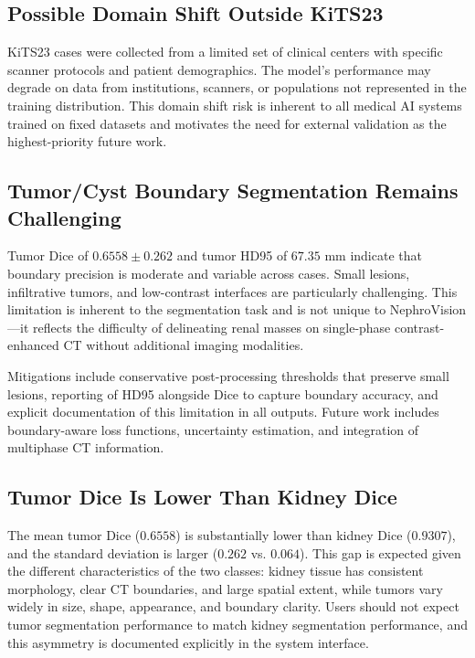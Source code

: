 \subsection{Possible Domain Shift Outside KiTS23}

KiTS23 cases were collected from a limited set of clinical centers with specific scanner protocols and patient demographics. The model's performance may degrade on data from institutions, scanners, or populations not represented in the training distribution. This domain shift risk is inherent to all medical AI systems trained on fixed datasets and motivates the need for external validation as the highest-priority future work.

\subsection{Tumor/Cyst Boundary Segmentation Remains Challenging}

Tumor Dice of $0.6558 \pm 0.262$ and tumor HD95 of $67.35$ mm indicate that boundary precision is moderate and variable across cases. Small lesions, infiltrative tumors, and low-contrast interfaces are particularly challenging. This limitation is inherent to the segmentation task and is not unique to NephroVision---it reflects the difficulty of delineating renal masses on single-phase contrast-enhanced CT without additional imaging modalities.

Mitigations include conservative post-processing thresholds that preserve small lesions, reporting of HD95 alongside Dice to capture boundary accuracy, and explicit documentation of this limitation in all outputs. Future work includes boundary-aware loss functions, uncertainty estimation, and integration of multiphase CT information.

\subsection{Tumor Dice Is Lower Than Kidney Dice}

The mean tumor Dice ($0.6558$) is substantially lower than kidney Dice ($0.9307$), and the standard deviation is larger ($0.262$ vs. $0.064$). This gap is expected given the different characteristics of the two classes: kidney tissue has consistent morphology, clear CT boundaries, and large spatial extent, while tumors vary widely in size, shape, appearance, and boundary clarity. Users should not expect tumor segmentation performance to match kidney segmentation performance, and this asymmetry is documented explicitly in the system interface.

